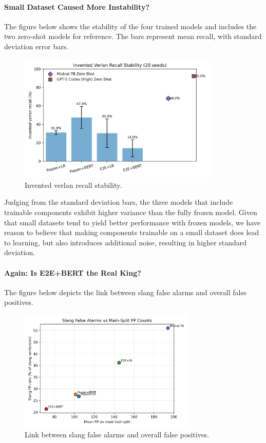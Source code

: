 \documentclass[12pt]{article}
\begin{document}
\paragraph{Small Dataset Caused More Instability?}

The figure below shows the stability of the four trained models and includes the two zero-shot models for reference. 
The bars represent mean recall, with standard deviation error bars.

\begin{figure}[H]
    \centering
    \includegraphics[width=0.85\textwidth]{figures/invented_recall_variance.png}
    \caption{Invented verlan recall stability.}
    \label{fig:invented-variance}
\end{figure}

Judging from the standard deviation bars, the three models that include trainable components exhibit higher variance than the fully frozen model. 
Given that small datasets tend to yield better performance with frozen models, we have reason to believe that making components trainable on a small dataset does lead to learning, but also introduces additional noise, resulting in higher standard deviation.

\paragraph{Again: Is E2E+BERT the Real King?}

The figure below depicts the link between slang false alarms and overall false positives.

\begin{figure}[H]
    \centering
    \includegraphics[width=0.75\textwidth]{figures/slang_fp_vs_main_fp.png}
    \caption{Link between slang false alarms and overall false positives.}
    \label{fig:slang-fp-correlation}
\end{figure}
\end{document}
